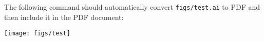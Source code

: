 \documentclass{article}
\begin{document}
The following command should automatically convert \verb|figs/test.ai| to PDF and then include it in the PDF document:

\centering\texttt{[image: figs/test]}
\end{document}
